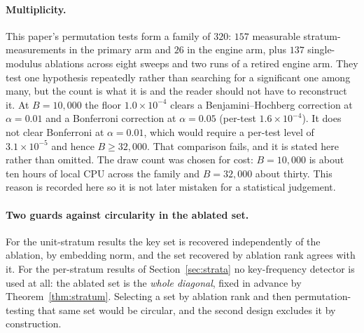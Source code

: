 \paragraph{Multiplicity.} This paper's permutation tests form a
family of $320$: $157$ measurable stratum-measurements in the primary arm and $26$ in the
engine arm, plus $137$ single-modulus ablations across eight sweeps and two runs of a retired engine arm. They test one
hypothesis repeatedly rather than searching for a significant one among many, but the count
is what it is and the reader should not have to reconstruct it. At $B = 10{,}000$ the floor
$1.0 \times 10^{-4}$ clears a Benjamini--Hochberg correction at $\alpha = 0.01$ and a
Bonferroni correction at $\alpha = 0.05$ (per-test $1.6 \times 10^{-4}$). It does not
clear Bonferroni at $\alpha = 0.01$, which would require a per-test level of
$3.1 \times 10^{-5}$ and hence $B \ge 32{,}000$. That comparison fails, and it is stated here
rather than omitted. The draw count was chosen for cost: $B = 10{,}000$ is about ten hours of
local CPU across the family and $B = 32{,}000$ about thirty. This reason is recorded here so
it is not later mistaken for a statistical judgement.

\paragraph{Two guards against circularity in the ablated set.}
For the unit-stratum results the key set is recovered independently of the ablation, by
embedding norm, and the set recovered by ablation rank agrees with it. For the
per-stratum results of Section~\ref{sec:strata} no key-frequency detector is used at
all: the ablated set is the \emph{whole diagonal}, fixed in advance by
Theorem~\ref{thm:stratum}. Selecting a set by ablation rank and then permutation-testing that
same set would be circular, and the second design excludes it by construction.

